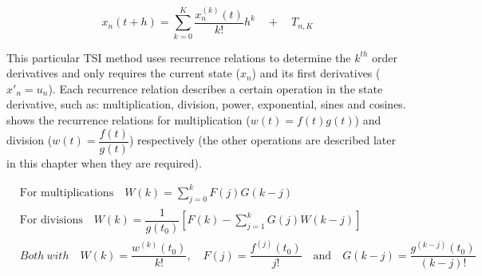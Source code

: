 




\begin{equation} \label{eq:general_taylor}
x_{n}\left(t+h\right)=\displaystyle\sum_{k=0}^{K}\dfrac{x_{n}^{\left(k\right)}\left(t\right)}{k!}h^{k} \quad + \quad	T_{n,K}
\end{equation}

\noindent
This particular \ac{TSI} method uses recurrence relations to determine the $k^{th}$ order derivatives and only requires the current state ($x_{n}$) and its first derivatives ($x'_{n} = u_{n}$). Each recurrence relation describes a certain operation in the state derivative, such as: multiplication, division, power, exponential, sines and cosines.  shows the recurrence relations for multiplication ($w\left(t\right)=f\left(t\right)g\left(t\right)$) and division ($w\left(t\right)=\dfrac{f\left(t\right)}{g\left(t\right)}$) respectively (the other operations are described later in this chapter when they are required).


\begin{equation} \label{eq:rec_rel}
\begin{split}
&\text{For multiplications} \quad W\left(k\right)=\displaystyle\sum_{j=0}^{k}F\left(j\right)G\left(k-j\right)\\
&\text{For divisions} \quad W\left(k\right)=\dfrac{1}{g\left(t_{0}\right)}\left[F\left(k\right)-\displaystyle\sum_{j=1}^{k} G\left(j\right)W\left(k-j\right)\right]\\
& Both \ with \quad W\left(k\right)=\dfrac{w^{\left(k\right)}\left(t_{0}\right)}{k!}, \quad F\left(j\right)=\dfrac{f^{\left(j\right)}\left(t_{0}\right)}{j!} \quad \text{and} \quad G\left(k-j\right)=\dfrac{g^{\left(k-j\right)}\left(t_{0}\right)}{\left(k-j\right)!}\\
\end{split}
\end{equation}

